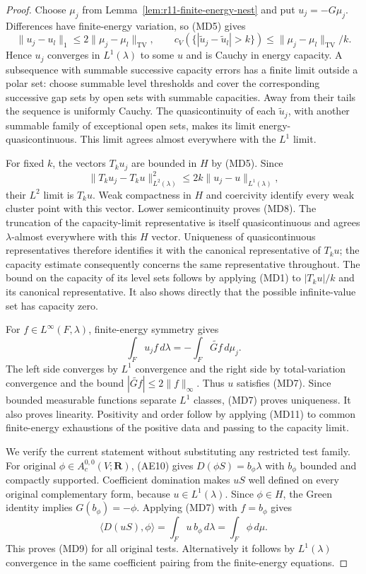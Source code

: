 \documentclass[11pt,a4paper]{article}
\numberwithin{equation}{section}
\theoremstyle{definition}
\theoremstyle{remark}
\begin{document}
\begin{proof}
Choose $\mu_j$ from Lemma~\ref{lem:r11-finite-energy-nest} and
put $u_j=-G\mu_j$.  Differences have finite-energy variation,
so (MD5) gives
\[
 \|u_j-u_l\|_1\leq2\|\mu_j-\mu_l\|_{\mathrm{TV}},\qquad
 c_V(\{|\widetilde u_j-\widetilde u_l|>k\})
       \leq\|\mu_j-\mu_l\|_{\mathrm{TV}}/k.
 \tag{MD11}
\]
Hence $u_j$ converges in $L^1(\lambda)$ to some $u$ and is
Cauchy in energy capacity.  A subsequence with summable
successive capacity errors has a finite limit outside a polar
set: choose summable level thresholds and cover the corresponding
successive gap sets by open sets with summable capacities.
Away from their tails the sequence is uniformly Cauchy.
The quasicontinuity of each $\widetilde u_j$, with another
summable family of exceptional open sets, makes its limit
energy-quasicontinuous.  This limit agrees almost everywhere
with the $L^1$ limit.

For fixed $k$, the vectors $T_ku_j$ are bounded in $H$ by
(MD5).  Since
\[
 \|T_ku_j-T_ku\|_{L^2(\lambda)}^2
                         \leq2k\|u_j-u\|_{L^1(\lambda)},
\]
their $L^2$ limit is $T_ku$.  Weak compactness in $H$ and
coercivity identify every weak cluster point with this vector.
Lower semicontinuity proves (MD8).
The truncation of the capacity-limit representative is itself
quasicontinuous and agrees $\lambda$-almost everywhere with
this $H$ vector.  Uniqueness of quasicontinuous representatives
therefore identifies it with the canonical representative of
$T_ku$; the capacity estimate consequently concerns the same
representative throughout.
The bound on the capacity of its level sets follows by applying
(MD1) to $|T_ku|/k$ and its canonical representative.
It also shows directly that the possible infinite-value set
has capacity zero.

For $f\in L^\infty(F,\lambda)$, finite-energy symmetry gives
\[
                  \int_Fu_j f\,d\lambda
                      =-\int_F\widetilde{Gf}\,d\mu_j .
\]
The left side converges by $L^1$ convergence and the right
side by total-variation convergence and the bound
$|\widetilde{Gf}|\leq2\|f\|_\infty$.
Thus $u$ satisfies (MD7).  Since bounded measurable functions
separate $L^1$ classes, (MD7) proves uniqueness.
It also proves linearity.  Positivity and order follow by
applying (MD11) to common finite-energy exhaustions of the
positive data and passing to the capacity limit.

We verify the current statement without substituting any
restricted test family.  For original
$\phi\in A_c^{0,0}(V;\mathbf R)$, (AE10) gives
$D(\phi S)=b_\phi\lambda$ with $b_\phi$ bounded and compactly
supported.  Coefficient domination makes $uS$ well defined
on every original complementary form, because $u\in L^1(\lambda)$.
Since $\phi\in H$, the Green identity implies
$G(b_\phi)=-\phi$.  Applying (MD7) with $f=b_\phi$ gives
\[
 \langle D(uS),\phi\rangle
        =\int_Fu\,b_\phi\,d\lambda
        =\int_F\phi\,d\mu .
 \tag{MD12}
\]
This proves (MD9) for all original tests.  Alternatively it
follows by $L^1(\lambda)$ convergence in the same coefficient
pairing from the finite-energy equations.


\end{proof}
\end{document}
